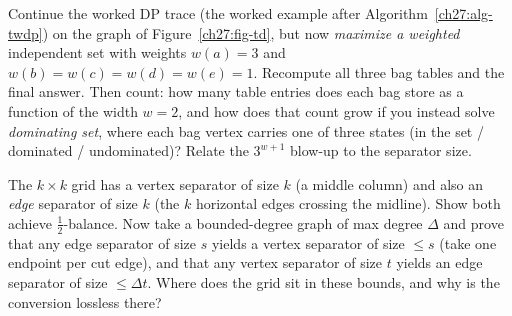 \begin{exercise}\label{ch27:ex-twdp-table}
Continue the worked DP trace (the worked example after Algorithm~\ref{ch27:alg-twdp}) on the graph of Figure~\ref{ch27:fig-td}, but now \emph{maximize a weighted} independent set with weights $w(a)=3$ and $w(b)=w(c)=w(d)=w(e)=1$. Recompute all three bag tables and the final answer. Then count: how many table entries does each bag store as a function of the width $w=2$, and how does that count grow if you instead solve \emph{dominating set}, where each bag vertex carries one of three states (in the set / dominated / undominated)? Relate the $3^{w+1}$ blow-up to the separator size.
\end{exercise}

\begin{exercise}\label{ch27:ex-edge-vs-vertex}
The $k\times k$ grid has a vertex separator of size $k$ (a middle column) and also an \emph{edge} separator of size $k$ (the $k$ horizontal edges crossing the midline). Show both achieve $\tfrac12$-balance. Now take a bounded-degree graph of max degree $\Delta$ and prove that any edge separator of size $s$ yields a vertex separator of size $\le s$ (take one endpoint per cut edge), and that any vertex separator of size $t$ yields an edge separator of size $\le \Delta t$. Where does the grid sit in these bounds, and why is the conversion lossless there?
\end{exercise}
